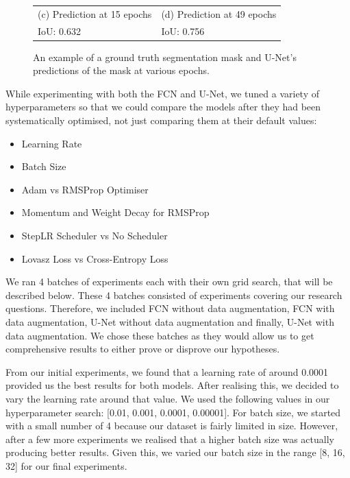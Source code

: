 \documentclass{article}
\begin{document}
\begin{figure}[htbp]
\begin{tabular}{ll}
(c) Prediction at 15 epochs & (d) Prediction at 49 epochs\\[6pt]
IoU: 0.632 & IoU: 0.756 \\[6pt]
\end{tabular}
\caption{An example of a ground truth segmentation mask and U-Net's predictions of the mask at various epochs.}
\label{fig:prediction}
\end{figure}

While experimenting with both the FCN and U-Net, we tuned a variety of hyperparameters so that we could compare the models after they had been systematically optimised, not just comparing them at their default values:
\begin{itemize}
    \item Learning Rate
    \item Batch Size
    \item Adam vs RMSProp Optimiser
    \item Momentum and Weight Decay for RMSProp
    \item StepLR Scheduler vs No Scheduler
    \item Lovasz Loss vs Cross-Entropy Loss
\end{itemize}

We ran 4 batches of experiments each with their own grid search, that will be described below. These 4 batches consisted of experiments covering our research questions. Therefore, we included FCN without data augmentation, FCN with data augmentation, U-Net without data augmentation and finally, U-Net with data augmentation. We chose these batches as they would allow us to get comprehensive results to either prove or disprove our hypotheses. 

From our initial experiments, we found that a learning rate of around 0.0001 provided us the best results for both models. After realising this, we decided to vary the learning rate around that value. We used the following values in our hyperparameter search: [0.01, 0.001, 0.0001, 0.00001]. For batch size, we started with a small number of 4 because our dataset is fairly limited in size. However, after a few more experiments we realised that a higher batch size was actually producing better results. Given this, we varied our batch size in the range [8, 16, 32] for our final experiments. 
\end{document}
